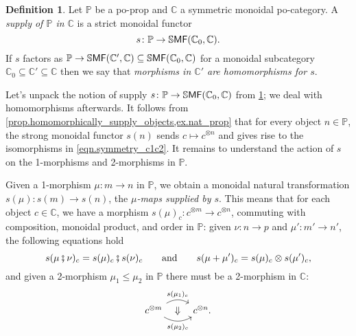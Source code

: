 \documentclass[11pt, oneside, article]{memoir}
\theoremstyle{plain}
\theoremstyle{definition}
\newtheorem{definition}[theorem]{Definition}
\theoremstyle{remark}
\newcommand{\Cat}[1]{{\mathsf{#1}}}%
\newcommand{\CCat}[1]{\mathbb{\StrLeft{#1}{1}}\Cat{\StrGobbleLeft{#1}{1}}}%
\newcommand{\tpow}[1]{^{\otimes #1}}
\newcommand{\ssmf}{\CCat{SMF}}
\newcommand{\cc}{\mathbb{C}}
\newcommand{\pp}{\mathbb{P}}
\newcommand{\mob}[1]{#1_0}
\newcommand{\cp}{\mathbin{\fatsemi}}
\renewcommand{\ss}{\subseteq}
\newcommand{\qqand}{\qquad\text{and}\qquad}
\begin{document}
\begin{definition}\label{def.supply}
Let $\pp$ be a po-prop and $\cc$ a symmetric monoidal po-category. A \emph{supply of $\pp$ in $\cc$} is a strict monoidal functor
\[
  s\colon\pp\to\ssmf(\mob{\cc},\cc).
\]
If $s$ factors as $\pp\to\ssmf(\cc',\cc)\ss\ssmf(\cc_0,\cc)$ for a monoidal subcategory $\cc_0\ss\cc'\ss\cc$ then we say that \emph{morphisms in $\cc'$ are homomorphisms for $s$}.
\end{definition}

Let's unpack the notion of supply $s\colon\pp\to\ssmf(\cc_0,\cc)$ from \cref{def.supply}; we deal with homomorphisms afterwards. It follows from \cref{prop.homomorphically_supply_objects,ex.nat_prop} that for every object $n\in\pp$, the strong monoidal functor $s(n)$ sends $c\mapsto c\tpow{n}$ and gives rise to the isomorphisms in \cref{eqn.symmetry_c1c2}. It remains to understand the action of $s$ on the 1-morphisms and 2-morphisms in $\pp$.

Given a 1-morphism $\mu\colon m\to n$ in $\pp$, we obtain a monoidal natural transformation $s(\mu)\colon s(m)\to s(n)$, the \emph{$\mu$-maps supplied by $s$}. This means that for each object $c\in\cc$, we have a morphism $s(\mu)_c\colon c\tpow{m}\to c\tpow{n}$, commuting with composition, monoidal product, and order in $\pp$: given $\nu\colon n\to p$ and $\mu'\colon m'\to n'$, the following equations hold
\begin{equation}\label{eqn.supply_composition}
  s(\mu\cp\nu)_c=s(\mu)_c\cp s(\nu)_c
  \qqand
	s(\mu+\mu')_c=s(\mu)_c\otimes s(\mu')_c,
\end{equation}
and given a 2-morphism $\mu_1\leq\mu_2$ in $\pp$ there must be a 2-morphism in $\cc$:
\begin{equation}\label{eqn.supply_2morphism}
\begin{tikzcd}
	c\tpow{m}\ar[r, bend left, "s(\mu_1)_c"]\ar[r, bend right, "s(\mu_2)_c"']\ar[r, phantom, "\Downarrow"]&
	c\tpow{n}.
\end{tikzcd}
\end{equation}
\end{document}
